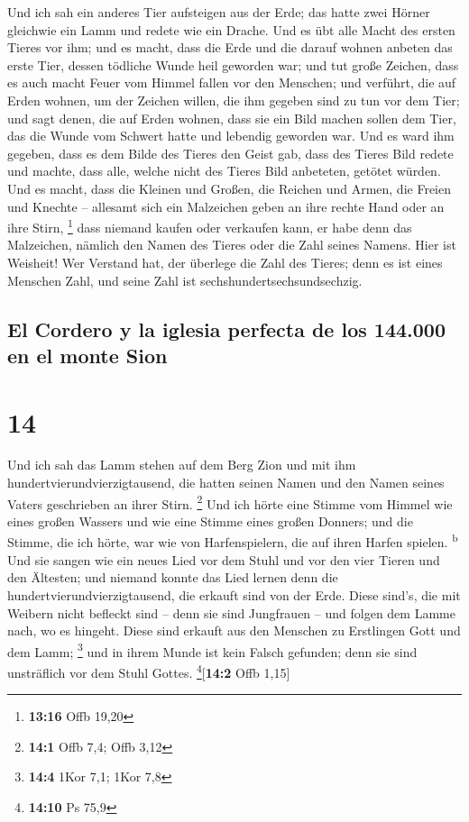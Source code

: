  Und ich sah ein anderes Tier aufsteigen aus der Erde;
das hatte zwei Hörner gleichwie ein Lamm und redete wie ein Drache.
 Und es übt alle Macht des ersten Tieres vor ihm; und es
macht, dass die Erde und die darauf wohnen anbeten das erste Tier,
dessen tödliche Wunde heil geworden war;  und tut große
Zeichen, dass es auch macht Feuer vom Himmel fallen vor den Menschen;
 und verführt, die auf Erden wohnen, um der Zeichen
willen, die ihm gegeben sind zu tun vor dem Tier; und sagt denen, die
auf Erden wohnen, dass sie ein Bild machen sollen dem Tier, das die
Wunde vom Schwert hatte und lebendig geworden war.  Und
es ward ihm gegeben, dass es dem Bilde des Tieres den Geist gab, dass
des Tieres Bild redete und machte, dass alle, welche nicht des Tieres
Bild anbeteten, getötet würden.  Und es macht, dass die
Kleinen und Großen, die Reichen und Armen, die Freien und Knechte --
allesamt sich ein Malzeichen geben an ihre rechte Hand oder an ihre
Stirn, \footnote{\textbf{13:16} Offb 19,20}  dass niemand
kaufen oder verkaufen kann, er habe denn das Malzeichen, nämlich den
Namen des Tieres oder die Zahl seines Namens.  Hier ist
Weisheit! Wer Verstand hat, der überlege die Zahl des Tieres; denn es
ist eines Menschen Zahl, und seine Zahl ist sechshundertsechsundsechzig.

\hypertarget{el-cordero-y-la-iglesia-perfecta-de-los-144.000-en-el-monte-sion}{%
\subsection{El Cordero y la iglesia perfecta de los 144.000 en el monte
Sion}\label{el-cordero-y-la-iglesia-perfecta-de-los-144.000-en-el-monte-sion}}

\hypertarget{section-13}{%
\section{14}\label{section-13}}

 Und ich sah das Lamm stehen auf dem Berg Zion und mit ihm
hundertvierundvierzigtausend, die hatten seinen Namen und den Namen
seines Vaters geschrieben an ihrer Stirn. \footnote{\textbf{14:1} Offb
  7,4; Offb 3,12}  Und ich hörte eine Stimme vom Himmel
wie eines großen Wassers und wie eine Stimme eines großen Donners; und
die Stimme, die ich hörte, war wie von Harfenspielern, die auf ihren
Harfen spielen. \textsuperscript{b}  Und sie sangen wie
ein neues Lied vor dem Stuhl und vor den vier Tieren und den Ältesten;
und niemand konnte das Lied lernen denn die
hundertvierundvierzigtausend, die erkauft sind von der Erde.
 Diese sind's, die mit Weibern nicht befleckt sind -- denn
sie sind Jungfrauen -- und folgen dem Lamme nach, wo es hingeht. Diese
sind erkauft aus den Menschen zu Erstlingen Gott und dem Lamm;
\footnote{\textbf{14:4} 1Kor 7,1; 1Kor 7,8}  und in ihrem
Munde ist kein Falsch gefunden; denn sie sind unsträflich vor dem Stuhl
Gottes. \footnote{\textbf{14:10} Ps 75,9}{[}\textbf{14:2} Offb 1,15{]}

